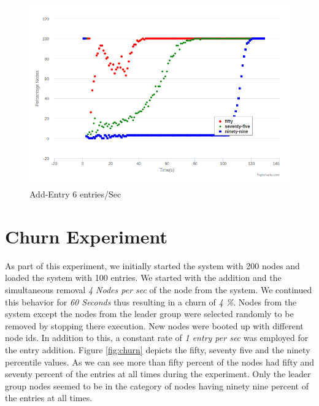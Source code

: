 \documentclass[12pt,a4paper,twoside,openright]{book}
\begin{document}
\begin{figure}[h]
	\includegraphics[scale=0.5]{200-6EntryPerSec}
	\caption{Add-Entry 6 entries/Sec}
	\label{fig:addEntry6}
\end{figure}

\section{Churn Experiment}

As part of this experiment, we initially started the system with 200 nodes and loaded the system with 100 entries. We started with the addition and the simultaneous removal \textit{4 Nodes per sec} of the node from the system. We continued this behavior for \textit{60 Seconds} thus resulting in a churn of \textit{4 \%}. Nodes from the system except the nodes from the leader group were selected randomly to be removed by stopping there execution. New nodes were booted up with different node ids. In addition to this, a constant rate of \textit{1 entry per sec} was employed for the entry addition. Figure \ref{fig:churn} depicts the fifty, seventy five and the ninety percentile values. As we can see more than fifty percent of the nodes had fifty and seventy percent of the entries at all times during the experiment. Only the leader group nodes seemed to be in the category of nodes having ninety nine percent of the entries at all times. 
\end{document}

